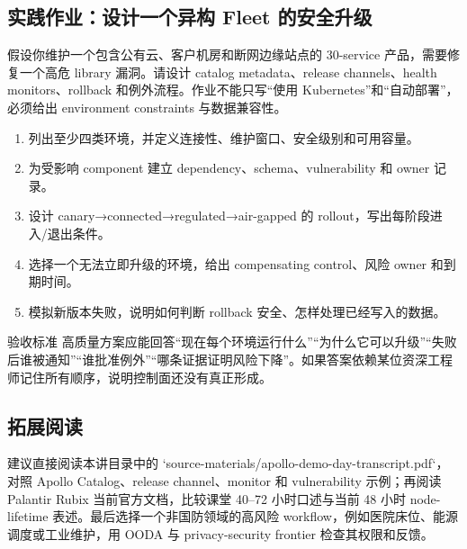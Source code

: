 \documentclass[a4paper]{article}
\begin{document}
\subsection{实践作业：设计一个异构 Fleet 的安全升级}

假设你维护一个包含公有云、客户机房和断网边缘站点的 30-service 产品，需要修复一个高危 library 漏洞。请设计 catalog metadata、release channels、health monitors、rollback 和例外流程。作业不能只写“使用 Kubernetes”和“自动部署”，必须给出 environment constraints 与数据兼容性。

\begin{enumerate}
  \item 列出至少四类环境，并定义连接性、维护窗口、安全级别和可用容量。
  \item 为受影响 component 建立 dependency、schema、vulnerability 和 owner 记录。
  \item 设计 canary→connected→regulated→air-gapped 的 rollout，写出每阶段进入/退出条件。
  \item 选择一个无法立即升级的环境，给出 compensating control、风险 owner 和到期时间。
  \item 模拟新版本失败，说明如何判断 rollback 安全、怎样处理已经写入的数据。
\end{enumerate}

\begin{knowledgebox}{验收标准}
高质量方案应能回答“现在每个环境运行什么”“为什么它可以升级”“失败后谁被通知”“谁批准例外”“哪条证据证明风险下降”。如果答案依赖某位资深工程师记住所有顺序，说明控制面还没有真正形成。
\end{knowledgebox}

\subsection{拓展阅读}

建议直接阅读本讲目录中的 `source-materials/apollo-demo-day-transcript.pdf`，对照 Apollo Catalog、release channel、monitor 和 vulnerability 示例；再阅读 Palantir Rubix 当前官方文档，比较课堂 40--72 小时口述与当前 48 小时 node-lifetime 表述。最后选择一个非国防领域的高风险 workflow，例如医院床位、能源调度或工业维护，用 OODA 与 privacy-security frontier 检查其权限和反馈。
\end{document}
